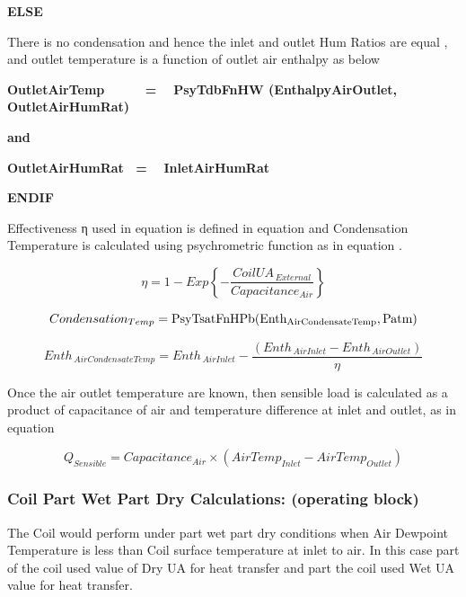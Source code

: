 \textbf{ELSE}

There is no condensation and hence the inlet and outlet Hum Ratios are equal , and outlet temperature is a function of outlet air enthalpy as below

\textbf{OutletAirTemp~~~~~ = ~ PsyTdbFnHW (EnthalpyAirOutlet, OutletAirHumRat)}

\textbf{and}

\textbf{OutletAirHumRat~ = ~ InletAirHumRat}

\textbf{ENDIF}

Effectiveness η used in equation is defined in equation and Condensation Temperature is calculated using psychrometric function as in equation .

\begin{equation}
\eta  = 1 - Exp\left\{ { - \frac{{CoilU{A_{\,External}}}}{{Capacitanc{e_{Air}}}}} \right\}
\end{equation}

\begin{equation}
Condensatio{n_{Temp}} = {\rm{PsyTsatFnHPb(Ent}}{{\rm{h}}_{{\rm{AirCondensateTemp}}}}{\rm{,Patm) }}
\end{equation}

\begin{equation}
Ent{h_{\,AirCondensateTemp}} = Ent{h_{\,AirInlet}} - \frac{{\left( {Ent{h_{\,AirInlet}} - Ent{h_{\,AirOutlet}}} \right)}}{\eta }
\end{equation}

Once the air outlet temperature are known, then sensible load is calculated as a product of capacitance of air and temperature difference at inlet and outlet, as in equation

\begin{equation}
{Q_{Sensible}} = Capacitanc{e_{Air}} \times \left( {AirTem{p_{Inlet}} - AirTem{p_{Outlet}}} \right)
\end{equation}

\subsubsection{Coil Part Wet Part Dry Calculations: (operating block)}\label{coil-part-wet-part-dry-calculations-operating-block}

The Coil would perform under part wet part dry conditions when Air Dewpoint Temperature is less than Coil surface temperature at inlet to air. In this case part of the coil used value of Dry UA for heat transfer and part the coil used Wet UA value for heat transfer.


